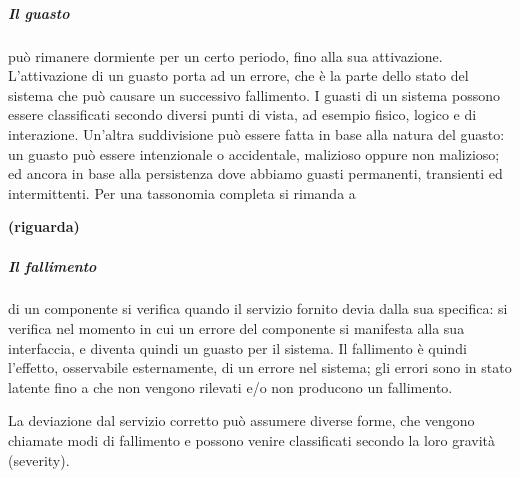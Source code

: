 \documentclass[14pt]{extarticle}
\begin{document}
\subparagraph{Il guasto} può rimanere dormiente per un certo periodo, fino alla sua attivazione. L'attivazione di un guasto porta ad un errore, che è la parte dello
stato del sistema che può causare un successivo fallimento. 
I guasti di un sistema possono essere classificati secondo diversi punti di vista, ad esempio
fisico, logico e di interazione. Un'altra suddivisione può essere fatta in base
alla natura del guasto: un guasto può essere intenzionale o accidentale, malizioso oppure non malizioso; ed ancora in base alla persistenza dove abbiamo
guasti permanenti, transienti ed intermittenti. Per una tassonomia completa
si rimanda a \cite{avizienis2004basic} 

\textbf{(riguarda)}
\subparagraph{Il fallimento} di un componente si verifica quando il servizio fornito devia
dalla sua specifica: si verifica nel momento in cui un errore del componente
si manifesta alla sua interfaccia, e diventa quindi un guasto per il sistema. Il
fallimento è quindi l'effetto, osservabile esternamente, di un errore nel sistema; gli errori sono in stato latente fino a che non vengono rilevati e/o non
producono un fallimento.

La deviazione dal servizio corretto può assumere diverse forme, che vengono chiamate modi di fallimento e possono venire classificati secondo la loro
gravità (severity).

\end{document}
